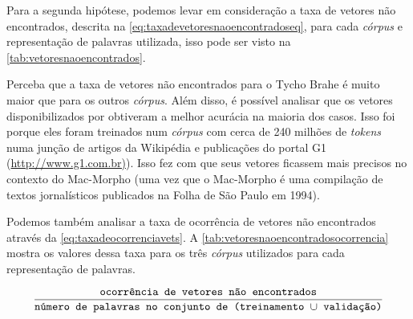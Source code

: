 Para a segunda hipótese, podemos levar em consideração a taxa de vetores não encontrados, descrita na \autoref{eq:taxadevetoresnaoencontradoseq}, para cada \textit{córpus} e representação de palavras utilizada, isso pode ser visto na \autoref{tab:vetoresnaoencontrados}. 




Perceba que a taxa de vetores não encontrados para o Tycho Brahe é muito maior que para os outros \textit{córpus}. Além disso, é possível analisar que os vetores disponibilizados por  obtiveram a melhor acurácia na maioria dos casos. Isso foi porque eles foram treinados num \textit{córpus} com cerca de 240 milhões de \textit{tokens} numa junção de artigos da Wikipédia e publicações do portal G1 (\url{http://www.g1.com.br)}). Isso fez com que seus vetores ficassem mais precisos no contexto do Mac-Morpho (uma vez que o Mac-Morpho é uma compilação de textos jornalísticos publicados na Folha de São Paulo em 1994).

Podemos também analisar a taxa de ocorrência de vetores não encontrados através da \autoref{eq:taxadeocorrenciavets}. A \autoref{tab:vetoresnaoencontradosocorrencia} mostra os valores dessa taxa para os três \textit{córpus} utilizados para cada representação de palavras.

\begin{equation} \label{eq:taxadeocorrenciavets}
\frac{\mbox{\texttt{ocorrência de vetores não encontrados}}}{\mbox{\texttt{número de palavras no conjunto de (treinamento $\cup$ validação)}}}
\end{equation}











